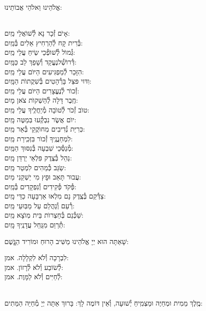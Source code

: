\documentclass[twoside, openany, parskip=half, 11pt]{book}
\begin{document}
\begin{small}אֱלֹהֵינוּ וֵאלֹהֵי אֲבוֹתֵינוּ:\end{small}\\
אָיׂם זְ֯כָר נָא לְ֯שׁוׂאֲלֵי \hfill מַֽיִם:\\
בְּ֯רִית קָח לְ֯הַרְחִיץ אֵלִים \hfill בְּ֯מַֽיִם:\\
גְּ֯מוׂל לְ֯שׁוׂפְ֯כֵי שִֹֽיחַ עֲלֵי \hfill מַֽיִם:\\
דְּ֯רוׂשְׁ֯לנֶעֱקַד וְ֯שָׁפַךְ לֵב \hfill כַּמָּֽיִם:\\
הִזָּכֵר לְ֯מַפְגִּיעִים הַיּוׂם עֲלֵי \hfill מַֽיִם:\\
וִדּוּי פּצֵּל בָּרְ֯הָטִים בְּ֯שִׁקֲתוׂת \hfill הַמָּֽיִם:\\
זְ֯כוׂר לְ֯נֶעֱצָרִים הַיּוׂם עֲלֵי \hfill מַֽיִם:\\
חֶֽבֶר דָּלָה לְ֯הַשְׁקוׂת צׂאן \hfill מָיִם:\\
טוׂב זְ֯כׂר לְ֯טוׂבָה מְ֯יַחֲלֶֽיךָ עֲלֵי \hfill מַֽיִם:\\
יוׂם אֲשֶׂר נִבְקְ֯עוּ בּֽמַטֶּה \hfill מָֽיִם:\\
כּֽרִיַּת נְ֯דִיבִים מֽחוׂקֲקֵי בְּ֯אֵר \hfill מַֽיִם:\\
לִמְחַנֲנֶֽיךָ זְ֯כוׂר בִּזְכִֽירַת \hfill מַֽיִם:\\
מְ֯נַסְּ֯כֵי שִׁבְעָה בְּ֯נִסּוּךְ \hfill הַמַּֽיִם:\\
נַהֵל בְּ֯צֶֽדֶק פִּלְאֵי יַרְדֵּן \hfill מָֽיִם:\\
שַֹגֵּב כְּ֯מֵהִים לִמְטַר \hfill מַֽיִם:\\
עֲבוּר תָּאַב וּפָץ מִי יַשְׁקֵנִי \hfill מַיִם:\\
פְּ֯קׂד פְּ֯קִידִים וְ֯נִפְקָדִים \hfill בְּ֯מַֽיִם:\\
צַדְּ֯קֵם בְּ֯צֶֽדֶק נָם מִלְאוּ אַרְבָּעָה כַדֵּי \hfill מָֽיִם:\\
רְ֯עֵם וְ֯נַהֲלֵם עַל מַבּֽוּעֵי \hfill מַֽיִם:\\
שַׁכְּ֯נֵם בְּ֯חַצְרוׂת בֵּית מֽוׂצָא \hfill מַֽיִם:\\
תְּ֯רַוֵּם מִנַּֽחַל עֲדָנֶֽיךָ \hfill מָֽיִם:

שָׁאַתָּה הוּא יְיָ אֱלֹהֵינוּ מַשִּׁיב הָרוּחַ וּמוֹרִיד הַגֱּֽשֶׁם:

לִבְרָכָה וְ֯לֹא לִקְלָלָה. \hfill אמן:\\
לְ֯שׂוֹבַע וְ֯לֹא לְ֯רָזוֹן. \hfill אמן:\\
לְ֯חַיִּים וְ֯לֹא לַמָּוֶת. \hfill אמן:

\\
מֶֽלֶךְ מֵמִית וּמְחַיֶּה וּמַצְמִֽיחַ יְ֯שׁוּעָה, וְ֯אֵין דּוֹמֶה לָךְ: בָּרוּךְ אַתָּה יְיָ מְ֯חַיֵּה הַמֵּתִים:
\end{document}
